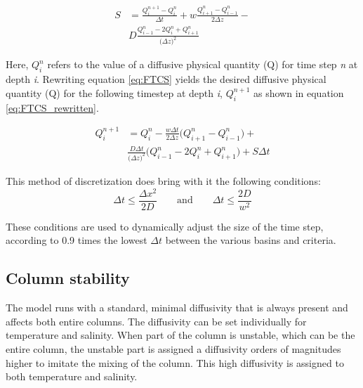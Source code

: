 \documentclass[twocolumn]{article}
\begin{document}
\begin{equation}
\begin{split}
    S& =\frac{Q^{n+1}_i-Q^n_i}{\Delta t} + w\frac{ Q^n_{i+1}-Q^n_{i-1}}{2 \Delta z} -\\
		&D\frac{Q^n_{i-1} -2Q^n_{i}+Q^n_{i+1}}{\big( \Delta z \big)^2} 
\end{split}
\label{eq:FTCS}
\end{equation}

\noindent Here, $Q^n_i$ refers to the value of a diffusive physical quantity (Q) for time step \textit{n} at depth \textit{i}. Rewriting equation \ref{eq:FTCS} yields the desired diffusive physical quantity (Q) for the following timestep at depth \textit{i}, $Q^{n+1}_i$ as shown in equation \ref{eq:FTCS_rewritten}.

\begin{equation}
\begin{split}
    Q^{n+1}_i& = Q^n_i-\frac{w \Delta t}{2 \Delta z} \Big( Q^n_{i+1}-Q^n_{i-1} \Big) + \\
		&\frac{D \Delta t}{\big( \Delta z \big)^2} \Big( Q^n_{i-1}-2Q^n_{i}+Q^n_{i+1} \Big) + S \Delta t
\end{split}
\label{eq:FTCS_rewritten}
\end{equation}

\noindent This method of discretization does bring with it the following conditions:
\begin{equation}
    \Delta t \leq \frac{\Delta x^2}{2D} \qquad \text{and} \qquad \Delta t \leq \frac{2D}{w^2}
\label{eq:FCTS_limits}
\end{equation}

\noindent These conditions are used to dynamically adjust the size of the time step, according to 0.9 times the lowest $\Delta t$ between the various basins and criteria.

\subsection{Column stability}
\label{sect:stability_methods}
The model runs with a standard, minimal diffusivity that is always present and affects both entire columns. The diffusivity can be set individually for temperature and salinity. When part of the column is unstable, which can be the entire column, the unstable part is assigned a diffusivity orders of magnitudes higher to imitate the mixing of the column. This high diffusivity is assigned to both temperature and salinity.
\end{document}
